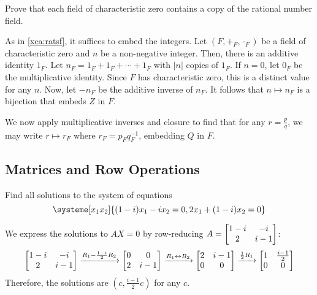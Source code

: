 \begin{xca}
  Prove that each field of characteristic zero contains a copy of the rational number field.
\end{xca}
\begin{prf}
  As in \cref{xca:ratsf}, it suffices to embed the integers.
  Let $(F, +_F, \cdot_F)$ be a field of characteristic zero and $n$ be a non-negative integer.
  Then, there is an additive identity $1_F$.
  Let $n_F = 1_F + 1_F + \dotsb + 1_F$ with $|n|$ copies of $1_F$.
  If $n = 0$, let $0_F$ be the multiplicative identity.
  Since $F$ has characteristic zero, this is a distinct value for any $n$.
  Now, let $-n_F$ be the additive inverse of $n_F$.
  It follows that $n \mapsto n_F$ is a bijection that embeds $Z$ in $F$.

  We now apply multiplicative inverses and closure to find that for any $r = \frac{p}{q}$,
  we may write $r \mapsto r_F$ where $r_F = p_F q_F^{-1}$, embedding $Q$ in $F$.
\end{prf}

\subsection{Matrices and Row Operations}

\begin{xca}
  Find all solutions to the system of equations
  \[ \systeme[x_1x_2]{{(1-i)}x_1 - ix_2 = 0, 2x_1 + {(1-i)}x_2 = 0} \]
\end{xca}
\begin{sol}
  We express the solutions to $AX = 0$ by row-reducing $A = \begin{bmatrix}1-i&-i\\2&i-1\end{bmatrix}$:
  \[
    \begin{bmatrix}1-i&-i\\2&i-1\end{bmatrix}
    \xrightarrow{R_1 - \frac{1-i}{2}R_2} \begin{bmatrix}0&0\\2&i-1\end{bmatrix}
    \xrightarrow{R_1 \leftrightarrow R_2} \begin{bmatrix}2&i-1\\0&0\end{bmatrix}
    \xrightarrow{\frac12 R_1} \begin{bmatrix}1&\frac{i-1}{2}\\0&0\end{bmatrix}
  \]
  Therefore, the solutions are $(c, \frac{i-1}{2}c)$ for any $c$.
\end{sol}

